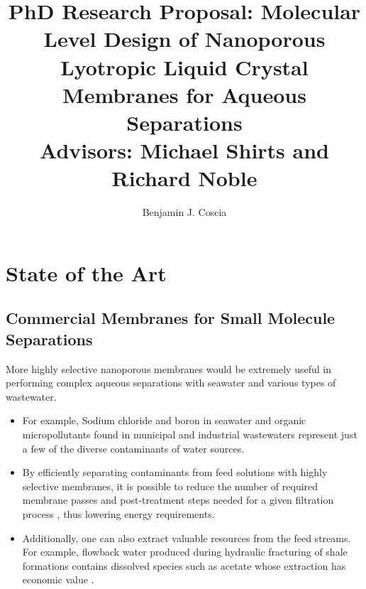 \documentclass{article}
\title{PhD Research Proposal: Molecular Level Design of Nanoporous Lyotropic Liquid
Crystal Membranes for Aqueous Separations \\ \vspace{0.5cm}
\large Advisors: Michael Shirts and Richard Noble}
\author{Benjamin J. Coscia}
\begin{document}
  \graphicspath{{./figures/}}

  \maketitle
  \thispagestyle{empty}
  \clearpage
  \setcounter{page}{1} %

  \section{State of the Art}\label{section:state-of-the-art}

  \subsection*{Commercial Membranes for Small Molecule Separations}
  
  
  More highly selective nanoporous membranes would be extremely useful
  in performing complex aqueous separations with seawater and various
  types of wastewater.
  \begin{itemize}
    \item For example, Sodium chloride and boron in seawater 
    \cite{fritzmann_state---art_2007} and organic micropollutants found in
    municipal and industrial wastewaters \cite{schwarzenbach_challenge_2006}
    represent just a few of the diverse contaminants of water sources. 
    \item By efficiently separating contaminants from feed solutions with
    highly selective membranes, it is possible to reduce the number of 
    required membrane passes and post-treatment steps needed for a given 
    filtration process \cite{werber_materials_2016}, thus lowering energy
    requirements. 
    \item Additionally, one can also extract valuable resources from the 
    feed streams. For example, flowback water produced during hydraulic
    fracturing of shale formations contains dissolved species such as acetate
    whose extraction has economic value \cite{dischinger_application_2017}.
  \end{itemize}
\end{document}
